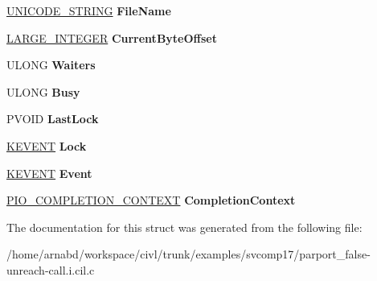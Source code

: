 \begin{DoxyCompactItemize}
\item 
\hypertarget{struct__FILE__OBJECT_ab9e9a15037948e136c1c5fba5a511771}{}\hyperlink{struct__UNICODE__STRING}{U\+N\+I\+C\+O\+D\+E\+\_\+\+S\+T\+R\+I\+N\+G} {\bfseries File\+Name}\label{struct__FILE__OBJECT_ab9e9a15037948e136c1c5fba5a511771}

\item 
\hypertarget{struct__FILE__OBJECT_a1784458d5b6604c1029f3872a31811de}{}\hyperlink{union__LARGE__INTEGER}{L\+A\+R\+G\+E\+\_\+\+I\+N\+T\+E\+G\+E\+R} {\bfseries Current\+Byte\+Offset}\label{struct__FILE__OBJECT_a1784458d5b6604c1029f3872a31811de}

\item 
\hypertarget{struct__FILE__OBJECT_a58adde1005e61d57f6a84ee0800e3044}{}U\+L\+O\+N\+G {\bfseries Waiters}\label{struct__FILE__OBJECT_a58adde1005e61d57f6a84ee0800e3044}

\item 
\hypertarget{struct__FILE__OBJECT_a55b0fdc8cd24bb400178076e7792b5bf}{}U\+L\+O\+N\+G {\bfseries Busy}\label{struct__FILE__OBJECT_a55b0fdc8cd24bb400178076e7792b5bf}

\item 
\hypertarget{struct__FILE__OBJECT_a8d74773d95b139f01d9958cd4eed5dac}{}P\+V\+O\+I\+D {\bfseries Last\+Lock}\label{struct__FILE__OBJECT_a8d74773d95b139f01d9958cd4eed5dac}

\item 
\hypertarget{struct__FILE__OBJECT_a9c9eb0c56f8419d6d5371f1467457296}{}\hyperlink{struct__KEVENT}{K\+E\+V\+E\+N\+T} {\bfseries Lock}\label{struct__FILE__OBJECT_a9c9eb0c56f8419d6d5371f1467457296}

\item 
\hypertarget{struct__FILE__OBJECT_a94fe98e3a1b690f2092ea201bc4ae0ab}{}\hyperlink{struct__KEVENT}{K\+E\+V\+E\+N\+T} {\bfseries Event}\label{struct__FILE__OBJECT_a94fe98e3a1b690f2092ea201bc4ae0ab}

\item 
\hypertarget{struct__FILE__OBJECT_aa5fcd20e6d4fcc04dec52d2115ddf481}{}\hyperlink{struct__IO__COMPLETION__CONTEXT}{P\+I\+O\+\_\+\+C\+O\+M\+P\+L\+E\+T\+I\+O\+N\+\_\+\+C\+O\+N\+T\+E\+X\+T} {\bfseries Completion\+Context}\label{struct__FILE__OBJECT_aa5fcd20e6d4fcc04dec52d2115ddf481}

\end{DoxyCompactItemize}


The documentation for this struct was generated from the following file\+:\begin{DoxyCompactItemize}
\item 
/home/arnabd/workspace/civl/trunk/examples/svcomp17/parport\+\_\+false-\/unreach-\/call.\+i.\+cil.\+c\end{DoxyCompactItemize}
